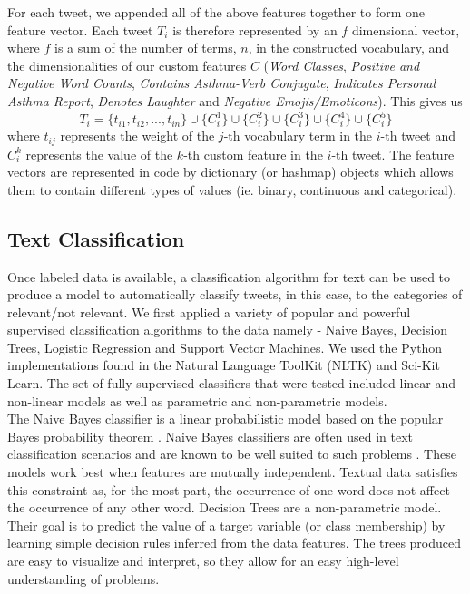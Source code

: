 \documentclass[10pt,letterpaper]{article}
\begin{document}
For each tweet, we appended all of the above features together to form one feature vector. Each tweet $T_i$ is therefore represented by an $f$ dimensional vector, where $f$ is a sum of the number of terms, $n$, in the constructed vocabulary, and the dimensionalities of our custom features $C$ (\textit{Word Classes}, \textit{Positive and Negative Word Counts}, \textit{Contains Asthma-Verb Conjugate}, \textit{Indicates Personal Asthma Report}, \textit{Denotes Laughter} and \textit{Negative Emojis/Emoticons}). This gives us 
%
\begin{displaymath}
T_i = \{t_{i1}, t_{i2}, ... , t_{in}\} \cup \{C^1_i\} \cup \{C^2_i\} \cup \{C^3_i\} \cup \{C^4_i\} \cup \{C^5_i\}
\end{displaymath}
%
where $t_{ij}$ represents the weight of the $j$-th vocabulary term in the $i$-th tweet and $C^k_i$ represents the value of the $k$-th custom feature in the $i$-th tweet. The feature vectors are represented in code by dictionary (or hashmap) objects which allows them to contain different types of values (ie. binary, continuous and categorical).

\subsection{Text Classification}\label{classification}
Once labeled data is available, a classification algorithm for text can be used to produce a model to automatically classify tweets, in this case, to the categories of relevant/not relevant. We first applied a variety of popular and powerful supervised classification algorithms to the data namely - Naive Bayes, Decision Trees, Logistic Regression and Support Vector Machines. We used the Python implementations found in the Natural Language ToolKit (NLTK) and Sci-Kit Learn. The set of fully supervised classifiers that were tested included linear and non-linear models as well as parametric and non-parametric models.\\ 

The Naive Bayes classifier is a linear probabilistic model based on the popular Bayes probability theorem \cite{REF16}. Naive Bayes classifiers are often used in text classification scenarios and are known to be well suited to such problems \cite{REF60}. These models work best when features are mutually independent. Textual data satisfies this constraint as, for the most part, the occurrence of one word does not affect the occurrence of any other word. Decision Trees are a non-parametric model. Their goal is to predict the value of a target variable (or class membership) by learning simple decision rules inferred from the data features. The trees produced are easy to visualize and interpret, so they allow for an easy high-level understanding of  problems.\\ 
\end{document}
